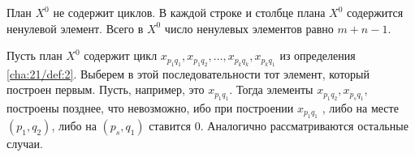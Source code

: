 \begin{propose}\label{cha:21/propose:3}
	План $X^0$ не содержит циклов. В каждой строке и столбце плана $X^0$ содержится ненулевой элемент. Всего в $X^0$ число ненулевых элементов равно $m + n − 1$.
\end{propose}
\begin{Proof}
	Пусть план $X^0$ содержит цикл $x_{p_1q_1}, x_{p_1q_2}, \dots, x_{p_kq_k}, x_{p_kq_1}$ из определения \ref{cha:21/def:2}. Выберем в этой последовательности тот элемент, который построен первым. Пусть, например, это $x_{p_1q_1}$. Тогда элементы $x_{p_1q_2}, x_{p_sq_1}$, построены позднее, что невозможно, ибо при построении $x_{p_1q_1}$ , либо на месте $(p_1, q_2)$, либо на $(p_s, q_1)$ ставится 0. Аналогично рассматриваются остальные случаи.
\end{Proof}





















